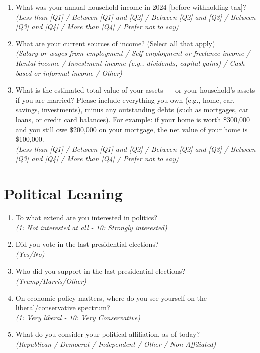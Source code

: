 \documentclass[11pt]{article}
\begin{document}
\begin{enumerate}
    \item What was your annual household income in 2024 [before withholding tax]?\\ 
    \textit{(Less than [Q1] / Between [Q1] and [Q2] / Between [Q2] and [Q3] / Between [Q3] and [Q4] / More than [Q4] / Prefer not to say)}
    \item What are your current sources of income? (Select all that apply)\\
    \textit{(Salary or wages from employment / Self-employment or freelance income / Rental income / Investment income (e.g., dividends, capital gains) / Cash-based or informal income / Other)}
    \item What is the estimated total value of your assets — or your household’s assets if you are married? Please include everything you own (e.g., home, car, savings, investments), minus any outstanding debts (such as mortgages, car loans, or credit card balances). For example: if your home is worth \$300,000 and you still owe \$200,000 on your mortgage, the net value of your home is \$100,000.\\
    \textit{(Less than [Q1] / Between [Q1] and [Q2] / Between [Q2] and [Q3] / Between [Q3] and [Q4] / More than [Q4] / Prefer not to say)}
\end{enumerate}
\section*{Political Leaning}
\begin{enumerate}[resume]
    \item To what extend are you interested in politics?\\ \textit{(1: Not interested at all - 10: Strongly interested)}
    \item Did you vote in the last presidential elections? \\\textit{(Yes/No)}
    \item Who did you support in the last presidential elections? \\ \textit{(Trump/Harris/Other)}
    \item On economic policy matters, where do you see yourself on the liberal/conservative spectrum? \\\textit{(1: Very liberal - 10: Very Conservative)}
    \item What do you consider your political affiliation, as of today? \\
    \textit{(Republican / Democrat / Independent / Other / Non-Affiliated)}
\end{enumerate}
\end{document}
